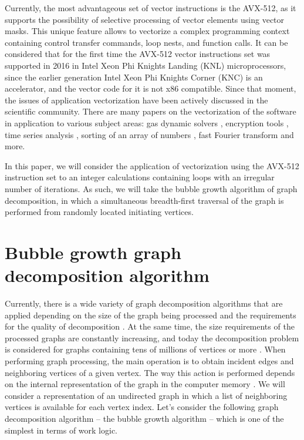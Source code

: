 \documentclass[
11pt,%
tightenlines,%
twoside,%
onecolumn,%
nofloats,%
nobibnotes,%
nofootinbib,%
superscriptaddress,%
noshowpacs,%
centertags]%
{revtex4}
\begin{document}
Currently, the most advantageous set of vector instructions is the AVX-512, as it supports the possibility of selective processing of vector elements using vector masks.
This unique feature allows to vectorize a complex programming context containing control transfer commands, loop nests, and function calls.
It can be considered that for the first time the AVX-512 vector instructions set was supported in 2016 in Intel Xeon Phi Knights Landing (KNL) microprocessors, since the earlier generation Intel Xeon Phi Knights Corner (KNC) is an accelerator, and the vector code for it is not x86 compatible.
Since that moment, the issues of application vectorization have been actively discussed in the scientific community.
There are many papers on the vectorization of the software in application to various subject areas: gas dynamic solvers \cite{12-1Kulikov}, encryption tools \cite{12-2Buhrow}, time series analysis \cite{12-3Quislant}, sorting of an array of numbers \cite{12-4Blacher}, fast Fourier transform \cite{12-5Sansone} and more.

In this paper, we will consider the application of vectorization using the AVX-512 instruction set to an integer calculations containing loops with an irregular number of iterations.
As such, we will take the bubble growth algorithm of graph decomposition, in which a simultaneous breadth-first traversal of the graph is performed from randomly located initiating vertices.

\section{Bubble growth graph decomposition algorithm}

Currently, there is a wide variety of graph decomposition algorithms that are applied depending on the size of the graph being processed and the requirements for the quality of decomposition \cite{13Ayall}.
At the same time, the size requirements of the processed graphs are constantly increasing, and today the decomposition problem is considered for graphs containing tens of millions of vertices or more \cite{14Lee}.
When performing graph processing, the main operation is to obtain incident edges and neighboring vertices of a given vertex.
The way this action is performed depends on the internal representation of the graph in the computer memory \cite{15Ahmed,16Salwasser}.
We will consider a representation of an undirected graph in which a list of neighboring vertices is available for each vertex index.
Let's consider the following graph decomposition algorithm -- the bubble growth algorithm -- which is one of the simplest in terms of work logic.
\end{document}
